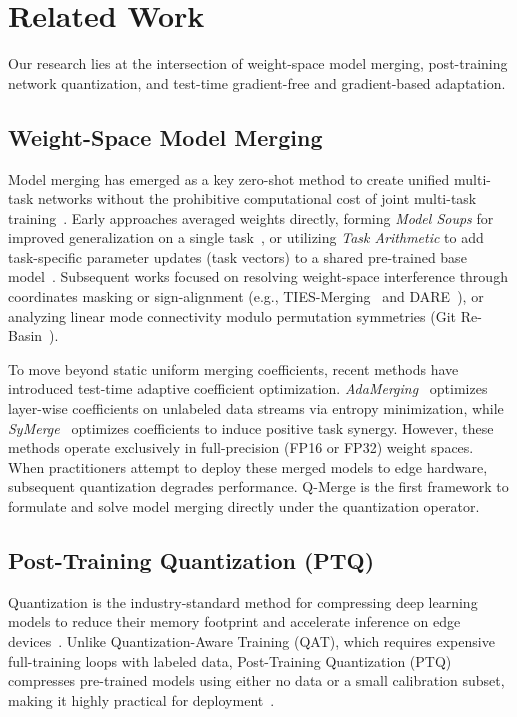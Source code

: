 \section{Related Work}
\label{sec:related_work}

Our research lies at the intersection of weight-space model merging, post-training network quantization, and test-time gradient-free and gradient-based adaptation.

\subsection{Weight-Space Model Merging}
Model merging has emerged as a key zero-shot method to create unified multi-task networks without the prohibitive computational cost of joint multi-task training~\cite{ilharco2022editing, wortsman2022model}. Early approaches averaged weights directly, forming \emph{Model Soups} for improved generalization on a single task~\cite{wortsman2022model}, or utilizing \emph{Task Arithmetic} to add task-specific parameter updates (task vectors) to a shared pre-trained base model~\cite{ilharco2022editing}. Subsequent works focused on resolving weight-space interference through coordinates masking or sign-alignment (e.g., TIES-Merging~\cite{yadav2023resolving} and DARE~\cite{yu2023language}), or analyzing linear mode connectivity modulo permutation symmetries (Git Re-Basin~\cite{ainsworth2022git, entezari2021role}).

To move beyond static uniform merging coefficients, recent methods have introduced test-time adaptive coefficient optimization. \emph{AdaMerging}~\cite{yang2024adamerging} optimizes layer-wise coefficients on unlabeled data streams via entropy minimization, while \emph{SyMerge}~\cite{jung2025symerge} optimizes coefficients to induce positive task synergy. However, these methods operate exclusively in full-precision (FP16 or FP32) weight spaces. When practitioners attempt to deploy these merged models to edge hardware, subsequent quantization degrades performance. Q-Merge is the first framework to formulate and solve model merging directly under the quantization operator.

\subsection{Post-Training Quantization (PTQ)}
Quantization is the industry-standard method for compressing deep learning models to reduce their memory footprint and accelerate inference on edge devices~\cite{jacob2018quantization, gholami2021survey}. Unlike Quantization-Aware Training (QAT), which requires expensive full-training loops with labeled data, Post-Training Quantization (PTQ) compresses pre-trained models using either no data or a small calibration subset, making it highly practical for deployment~\cite{nagel2020adaround}. 


